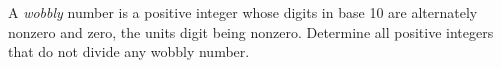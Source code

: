 A \emph{wobbly} number is a positive integer whose digits in base 10 are alternately nonzero and zero, the units digit being nonzero. Determine all positive integers that do not divide any wobbly number.

